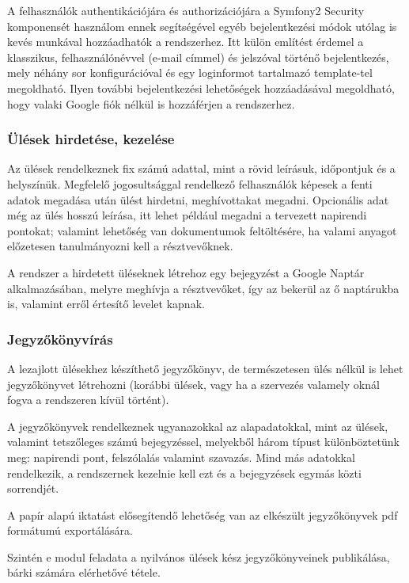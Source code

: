 \documentclass[a4paper,12pt,oneside]{report}
\begin{document}
A felhasználók authentikációjára és authorizációjára a Symfony2 Security komponensét használom \textendash{} ennek segítségével egyéb bejelentkezési módok utólag is kevés munkával hozzáadhatók a rendszerhez. Itt külön említést érdemel a klasszikus, felhasználónévvel (e-mail címmel) és jelszóval történő bejelentkezés, mely néhány sor konfigurációval és egy loginformot tartalmazó template-tel megoldható. Ilyen további bejelentkezési lehetőségek hozzáadásával megoldható, hogy valaki Google fiók nélkül is hozzáférjen a rendszerhez.

\subsubsection{Ülések hirdetése, kezelése}

Az ülések rendelkeznek fix számú adattal, mint a rövid leírásuk, időpontjuk és a helyszínük. Megfelelő jogosultsággal rendelkező felhasználók képesek a fenti adatok megadása után ülést hirdetni, meghívottakat megadni. Opcionális adat még az ülés hosszú leírása, itt lehet például megadni a tervezett napirendi pontokat; valamint lehetőség van dokumentumok feltöltésére, ha valami anyagot előzetesen tanulmányozni kell a résztvevőknek.

A rendszer a hirdetett üléseknek létrehoz egy bejegyzést a Google Naptár alkalmazásában, melyre meghívja a résztvevőket, így az bekerül az ő naptárukba is, valamint erről értesítő levelet kapnak.

\subsubsection{Jegyzőkönyvírás}

A lezajlott ülésekhez készíthető jegyzőkönyv, de természetesen ülés nélkül is lehet jegyzőkönyvet létrehozni (korábbi ülések, vagy ha a szervezés valamely oknál fogva a rendszeren kívül történt).

A jegyzőkönyvek rendelkeznek ugyanazokkal az alapadatokkal, mint az ülések, valamint tetszőleges számú bejegyzéssel, melyekből három típust különböztetünk meg: napirendi pont, felszólalás valamint szavazás. Mind más adatokkal rendelkezik, a rendszernek kezelnie kell ezt és a bejegyzések egymás közti sorrendjét.

A papír alapú iktatást elősegítendő lehetőség van az elkészült jegyzőkönyvek pdf formátumú exportálására.

Szintén e modul feladata a nyilvános ülések kész jegyzőkönyveinek publikálása, bárki számára elérhetővé tétele.
\end{document}
